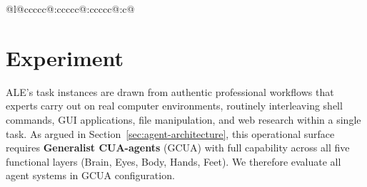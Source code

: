 \documentclass{llmxive}
\begin{document}
\begin{table}[t]
{{\begin{tabular}{@{\hskip 4pt}l@{\hskip 6pt}ccccc@{\hskip 7pt}:ccccc@{\hskip 7pt}:ccccc@{\hskip 6pt}:c@{\hskip 4pt}}
\bottomrule
\end{tabular}}\par}
\caption{\textbf{Main results on ALE.}
Each difficulty level reports the full-pass rate~(\textbf{Pass}, \%),
the mean score~(\textbf{Score}, \%),
total API cost~(\textbf{{money-bill-alt}}),
total wall-clock time~(\textbf{{clock}}),
and total token use~(\textbf{Tok.}).
The final \textbf{Overall Pass Rate} column reports the full-pass rate over all evaluated tasks in the three difficulty levels.
``--''~cost data not available.
Superscript~$\pm$ values denote score standard deviations estimated from three independent runs of the same task instance; due to compute budget constraints, only a subset of configurations include repeated runs.
$^\dagger$Model uses an additional visual sub-agent for visual perception.
The lower panel reports \textbf{ALE-CLI}, the Linux-only subset, comparing CLI agents alongside GCUA references~($^*$).}
\label{tab:main-results}
\end{table}

\section{Experiment}
\label{sec:experiment}

ALE's task instances are drawn from authentic professional workflows that experts carry out on real computer environments, routinely interleaving shell commands, GUI applications, file manipulation, and web research within a single task.
As argued in Section~\ref{sec:agent-architecture}, this operational surface requires \textbf{Generalist CUA-agents} (GCUA) with full capability across all five functional layers (Brain, Eyes, Body, Hands, Feet). We therefore evaluate all agent systems in GCUA configuration.
\end{document}
